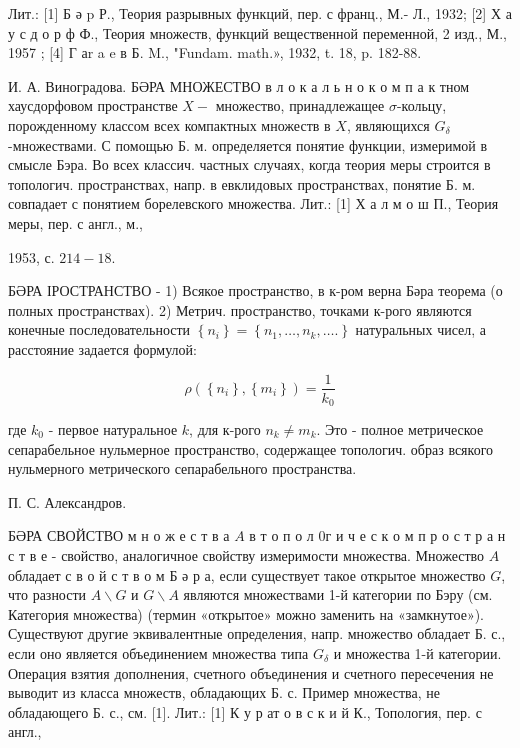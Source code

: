 \documentclass[10pt]{article}
\begin{document}
Лит.: [1] Б ә p Р., Теория разрывных функций, пер. с франц., М.- Л., 1932; [2] Х а у с д о р ф Ф., Теория множеств, функций вещественной переменной, 2 изд., М., 1957 ; [4] Г аr a e в Б. M., "Fundam. math.», 1932, t. 18, p. 182-88.



И. А. Виноградова. БӘРА МНОЖЕСТВО в л $о$ к а л ь н $о$ к о м п а к тном хаусдорфовом пространстве $X-$ множество, принадлежащее $\sigma$-кольцу, порожденному классом всех компактных множеств в $X$, являющихся $G_{\delta}$-множествами. С помощью Б. м. определяется понятие функции, измеримой в смысле Бэра. Во всех классич. частных случаях, когда теория меры строится в топологич. пространствах, напр. в евклидовых пространствах, понятие Б. м. совпадает с понятием борелевского множества. Лит.: [1] Х а л м о ш П., Теория меры, пер. с англ., м.,

1953, с. $214-18$.



БӘРА ІРОСТРАНСТВО - 1) Всякое пространство, в к-ром верна Бәра теорема (о полных пространствах). 2) Метрич. пространство, точками к-рого являются конечные последовательности $\left\{n_{i}\right\}=\left\{n_{1}, \ldots, n_{k}, \ldots.\right\}$ натуральных чисел, а расстояние задается формулой:



\[

\rho\left(\left\{n_{i}\right\},\left\{m_{i}\right\}\right)=\frac{1}{k_{0}}

\]



где $k_{0}$ - первое натуральное $k$, для к-рого $n_{k} \neq m_{k}$. Это - полное метрическое сепарабельное нульмерное пространство, содержащее топологич. образ всякого нульмерного метрического сепарабельного пространства.



П. С. Александров.



БӘРА СВОЙСТВО м н о ж е с т в а $A$ в т о п о л 0г и ч е с к о м п р о с т р а н с т в е - свойство, аналогичное свойству измеримости множества. Множество $A$ обладает с в о й с т в о м Б ә р а, если существует такое открытое множество $G$, что разности $A \backslash G$ и $G \backslash A$ являются множествами 1-й категории по Бэру (см. Категория множества) (термин «открытое» можно заменить на «замкнутое»). Существуют другие эквивалентные определения, напр. множество обладает Б. с., если оно является объединением множества типа $G_{\delta}$ и множества 1-й категории. Операция взятия дополнения, счетного объединения и счетного пересечения не выводит из класса множеств, обладающих Б. с. Пример множества, не обладающего Б. с., см. [1]. Лит.: [1] К у р ат о в с к и й К., Топология, пер. с англ.,
\end{document}
